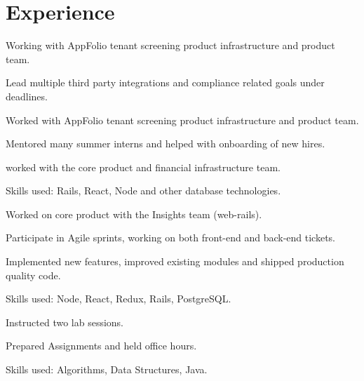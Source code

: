 \section{Experience}

    \vspace{\topsep}
    \begin{tightemize}
      \item Working with AppFolio tenant screening product infrastructure and product team.
      \item Lead multiple third party integrations and compliance related goals under deadlines.
    \end{tightemize} 
    \sectionsep

    \vspace{\topsep}
    \begin{tightemize}
      \item Worked with AppFolio tenant screening product infrastructure and product team.
      \item Mentored many summer interns and helped with onboarding of new hires.
      \item worked with the core product and financial infrastructure team.
      \item Skills used: Rails, React, Node and other database technologies.
    \end{tightemize}
    \sectionsep

    \vspace{\topsep}
    \begin{tightemize}
      \item Worked on core product with the Insights team (web-rails).
      \item Participate in Agile sprints, working on both front-end and back-end tickets.
      \item Implemented new features, improved existing modules and shipped production quality code.
      \item Skills used: Node, React, Redux, Rails, PostgreSQL.
    \end{tightemize}
    \sectionsep

    \begin{tightemize}
      \item Instructed two lab sessions.
      \item Prepared Assignments and held office hours.
      \item Skills used: Algorithms, Data Structures, Java.
    \end{tightemize}
    \sectionsep

